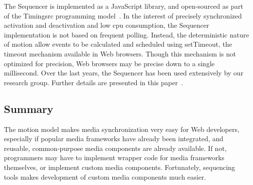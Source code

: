 
The Sequencer is implemented as a JavaScript library, and open-sourced as part
of the Timingsrc programming model~\cite{timingsrc}. In the interest of
precisely synchronized activation and deactivation and low cpu consumption,
the Sequencer implementation is not based on frequent polling. Instead, the
deterministic nature of motion allow events to be calculated and scheduled
using setTimeout, the timeout mechanism available in Web browsers. Though this
mechanism is not optimized for precision, Web browsers may be precise down to
a single millisecond. Over the last years, the Sequencer has been used
extensively by our research group. Further details are presented in this
paper~\cite{sequencer}.


\subsection{Summary}

The motion model makes media synchronization very easy for Web developers,
especially if popular media frameworks have already been integrated, and
reusable, common-purpose media components are already available. If not,
programmers may have to implement wrapper code for media frameworks
themselves, or implement custom media components. Fortunately, sequencing
tools makes development of custom media components much easier.

